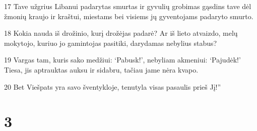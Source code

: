 \par 17 Tave užgrius Libanui padarytas smurtas ir gyvulių grobimas gąsdins tave dėl žmonių kraujo ir kraštui, miestams bei visiems jų gyventojams padaryto smurto. 
\par 18 Kokia nauda iš drožinio, kurį drožėjas padarė? Ar iš lieto atvaizdo, melų mokytojo, kuriuo jo gamintojas pasitiki, darydamas nebylius stabus? 
\par 19 Vargas tam, kuris sako medžiui: ‘Pabusk!’, nebyliam akmeniui: ‘Pajudėk!’ Tiesa, jis aptrauktas auksu ir sidabru, tačiau jame nėra kvapo. 
\par 20 Bet Viešpats yra savo šventykloje, tenutyla visas pasaulis prieš Jį!”



\chapter{3}


